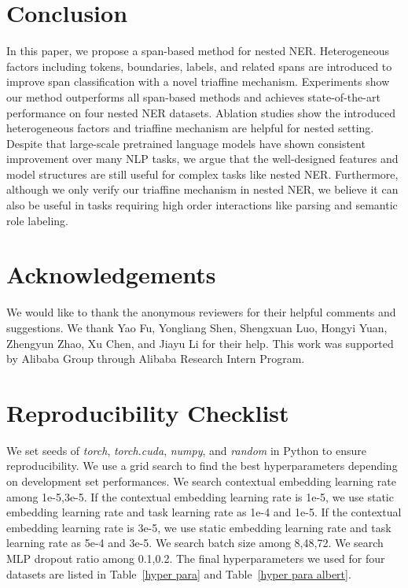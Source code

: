 \documentclass[11pt]{article}
\begin{document}
\section{Conclusion}




In this paper, we propose a span-based method for nested NER.
Heterogeneous factors including tokens, boundaries, labels, and related spans are introduced to improve span classification with a novel triaffine mechanism.
Experiments show our method outperforms all span-based methods and achieves state-of-the-art performance on four nested NER datasets.
Ablation studies show the introduced heterogeneous factors and triaffine mechanism are helpful for nested setting.
Despite that large-scale pretrained language models have shown consistent improvement over many NLP tasks, we argue that the well-designed features and model structures are still useful for complex tasks like nested NER. 
Furthermore, although we only verify our triaffine mechanism in nested NER, we believe it can also be useful in tasks requiring high order interactions like parsing and semantic role labeling.

\section*{Acknowledgements}
We would like to thank the anonymous reviewers for their helpful comments and suggestions.
We thank Yao Fu, Yongliang Shen, Shengxuan Luo, Hongyi Yuan, Zhengyun Zhao, Xu Chen, and Jiayu Li for their help.
This work was supported by Alibaba Group through Alibaba Research Intern Program.






\appendix

\section{Reproducibility Checklist}
\label{appendix:para}
We set seeds of \textit{torch}, \textit{torch.cuda}, \textit{numpy}, and \textit{random} in Python to ensure reproducibility.
We use a grid search to find the best hyperparameters depending on development set performances.
We search contextual embedding learning rate among 1e-5,3e-5. If the contextual embedding learning rate is 1e-5, we use static embedding learning rate and task learning rate as 1e-4 and 1e-5. If the contextual embedding learning rate is 3e-5, we use static embedding learning rate and task learning rate as 5e-4 and 3e-5. We search batch size among 8,48,72.
We search MLP dropout ratio among 0.1,0.2.
The final hyperparameters we used for four datasets are listed in Table~\ref{hyper para} and Table~\ref{hyper para albert}.
\end{document}
